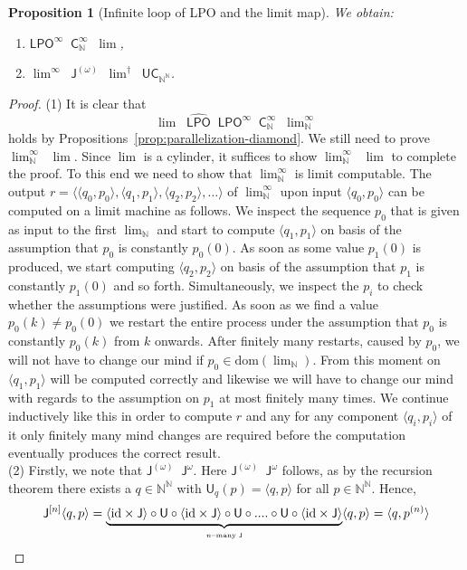 \documentclass[11pt,a4paper]{amsart}
\theoremstyle{plain}
\newtheorem{prop}[thm]{Proposition}
\theoremstyle{definition}
\theoremstyle{defC}
\theoremstyle{thmC}
\theoremstyle{plain}
\numberwithin{equation}{section}
\def\IN{{\mathbb{N}}}
\def\J{{\mathsf{{J}}}}
\def\U{{\mathsf{{U}}}}
\def\C{{\mathsf{{C}}}}
\def\LPO{\mathsf{LPO}}
\def\C{\mathsf{C}}
\def\leqW{\mathop{\leq_{\mathrm{W}}}}
\def\equivW{\mathop{\equiv_{\mathrm{W}}}}
\def\leqSW{\mathop{\leq_{\mathrm{sW}}}}
\def\equivSW{\mathop{\equiv_{\mathrm{sW}}}}
\def\lW{\mathop{<_{\mathrm{W}}}}
\def\leqW{\mathop{\leq_{\mathrm{W}}}}
\def\equivW{\mathop{\equiv_{\mathrm{W}}}}
\def\leqSW{\mathop{\leq_{\mathrm{sW}}}}
\def\equivSW{\mathop{\equiv_{\mathrm{sW}}}}
\def\lW{\mathop{<_{\mathrm{W}}}}
\def\id{{\mathrm{id}}}
\def\dom{{\mathrm{dom}}}
\begin{document}
\begin{prop}[Infinite loop of LPO and the limit map]
\label{prop:LPO-lim}
We obtain:
\begin{enumerate}
\item $\LPO^\infty\equivSW\C_\IN^\infty\equivSW\lim$,
\item $\lim^\infty\equivSW\J^{(\omega)}\lW\lim^\dagger\equivW\U\C_{\IN^\IN}$.
\end{enumerate}
\end{prop}
\begin{proof}
(1) It is clear that 
\[\lim\equivSW\widehat{\LPO}\leqSW\LPO^\infty\leqSW\C_\IN^\infty\equivSW\lim\nolimits_\IN^\infty\]
holds by
Propositions~\ref{prop:parallelization-diamond}. We still need to prove $\lim_\IN^\infty\leqSW\lim$.
Since $\lim$ is a cylinder, it suffices to show $\lim_\IN^\infty\leqW\lim$ to complete the proof.
To this end we need to show that $\lim_\IN^\infty$ is limit computable.
The output $r=\langle \langle q_0,p_0\rangle,\langle q_1, p_1\rangle,\langle q_2, p_2\rangle,...\rangle$ of 
$\lim_\IN^\infty$ upon input $\langle q_0,p_0\rangle$ can be
computed on a limit machine as follows. We inspect the sequence $p_0$  
that is given as input to the first $\lim_\IN$
and start to compute $\langle q_1,p_1\rangle$ on basis of the assumption that $p_0$ is constantly $p_0(0)$.
As soon as some value $p_1(0)$ is produced, we start computing $\langle q_2,p_2\rangle$ on basis of
the assumption that $p_1$ is constantly $p_1(0)$ and so forth. Simultaneously, we inspect the $p_i$
to check whether the assumptions were justified. As soon as we find a value $p_0(k)\not=p_0(0)$
we restart the entire process under the assumption that $p_0$ is constantly $p_0(k)$ from $k$ onwards.
After finitely many restarts, caused by $p_0$, we will not have to change our mind if $p_0\in\dom(\lim_\IN)$.
From this moment on $\langle q_1,p_1\rangle$ will be computed correctly and likewise we will have
to change our mind with regards to the assumption on $p_1$ at most finitely many times. 
We continue inductively like this in order to compute $r$ and any for any component $\langle q_i,p_i\rangle$
of it only finitely many mind changes are required before the computation eventually produces the correct result.\\
(2) Firstly, we note that $\J^{(\omega)}\equivSW\J^\omega$. Here $\J^{(\omega)}\leqSW\J^\omega$ follows,
as by the recursion theorem there exists a $q\in\IN^\IN$ with $\U_q(p)=\langle q,p\rangle$ for all $p\in\IN^\IN$.
Hence,
\[\J^{[n]}\langle q,p\rangle=\underbrace{\langle\id\times \J\rangle\circ\U\circ\langle \id\times \J\rangle\circ \U\circ....\circ\U\circ\langle\id\times\J\rangle}_{\mbox{\tiny $n$--many $\J$}}\langle q,p\rangle=\langle q,p^{(n)}\rangle\]

\end{proof}
\end{document}
